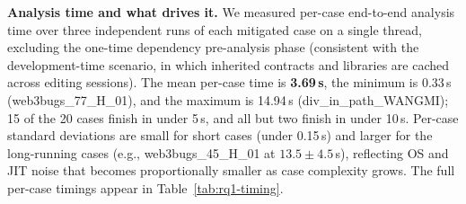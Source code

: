 \documentclass[pdflatex,sn-basic]{sn-jnl}%
\theoremstyle{thmstyleone}%
\theoremstyle{thmstyletwo}%
\theoremstyle{thmstylethree}%
\begin{document}
\smallskip
\noindent\textbf{Analysis time and what drives it.}
We measured per-case end-to-end analysis time over three independent runs of each mitigated case on a single thread, excluding the one-time dependency pre-analysis phase (consistent with the development-time scenario, in which inherited contracts and libraries are cached across editing sessions).
The mean per-case time is \textbf{3.69\,s}, the minimum is 0.33\,s (web3bugs\_77\_H\_01), and the maximum is 14.94\,s (div\_in\_path\_WANGMI); 15 of the 20 cases finish in under 5\,s, and all but two finish in under 10\,s.
Per-case standard deviations are small for short cases (under 0.15\,s) and larger for the long-running cases (e.g., web3bugs\_45\_H\_01 at $13.5 \pm 4.5$\,s), reflecting OS and JIT noise that becomes proportionally smaller as case complexity grows.
The full per-case timings appear in Table~\ref{tab:rq1-timing}.
\end{document}
